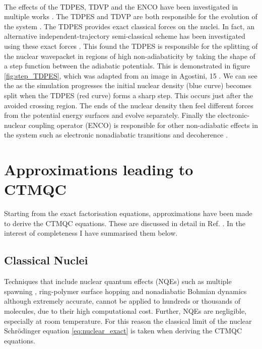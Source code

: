 \\
The effects of the TDPES, TDVP and the ENCO have been investigated in multiple works \cite{agostini_semiclassical_2015, agostini_exact_2015, agostini_mixed_2013, abedi_dynamical_2013, Min2014Dec}. The TDPES and TDVP are both responsible for the evolution of the system
\cite{agostini_semiclassical_2015}. The TDPES provides exact classical forces on the nuclei. In fact, an alternative independent-trajectory semi-classical scheme has been investigated using these exact forces \cite{agostini_exact_2015}. This found the TDPES is responsible for the splitting of the nuclear wavepacket in regions of high non-adiabaticity by taking the shape of a step function between the  adiabatic potentials. This is demonstrated in figure \ref{fig:step_TDPES}, which was adapted from an image in Agostini, 15 \cite{agostini_semiclassical_2015}. We can see  the as the simulation progresses the initial nuclear density (blue curve) becomes split when the TDPES (red curve) forms a sharp step. This occurs just after the avoided crossing region. The  ends of the nuclear density then feel different forces from the  potential energy surfaces and evolve separately. Finally the electronic-nuclear coupling operator (ENCO) is responsible for other non-adiabatic effects in the system such as electronic nonadiabatic transitions and decoherence \cite{agostini_semiclassical_2015}.
\section{Approximations leading to CTMQC}
\label{sect:CTMQC_Approx}
Starting from the exact factorisation equations,  approximations have been made to derive the CTMQC equations. These are discussed in detail in Ref. \cite{agostini_quantum-classical_2016}. In the interest of completeness I have summarised them below.
\subsection{Classical Nuclei}
Techniques that include nuclear quantum effects (NQEs)\replace{;}{,} such as multiple spawning \cite{Martnnez*2005Oct}, ring-polymer surface hopping \cite{Shakib2017Jul} and nonadiabatic Bohmian dynamics \cite{Curchod2011Feb, Tavernelli2013Apr} although extremely accurate, cannot be applied to hundreds or thousands of molecules, due to their high computational cost. Further,  NQEs are negligible, especially at room temperature. For this reason the classical limit of the nuclear Schr\"odinger equation \eqref{eq:nuclear_exact} is taken when deriving the CTMQC equations.
